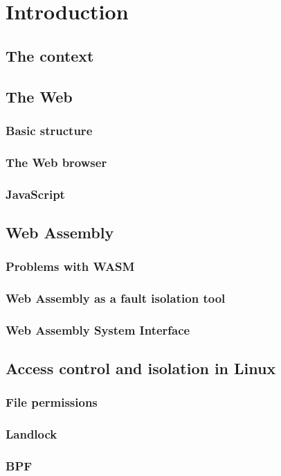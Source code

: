 \chapter{Introduction}

\section{The context}

\section{The Web}
\subsection{Basic structure}
\subsection{The Web browser}
\subsection{JavaScript}

\section{Web Assembly}
\subsection{Problems with WASM}
\subsection{Web Assembly as a fault isolation tool}
\subsection{Web Assembly System Interface}

\section{Access control and isolation in Linux}
\subsection{File permissions}
\subsection{Landlock}
\subsection{BPF}